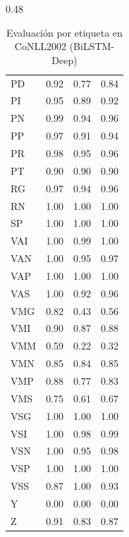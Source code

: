 \begin{table}[H]
\begin{subtable}{0.48\textwidth}
\begin{tabular}{lccc}
PD  & 0.92 & 0.77 & 0.84 \\
PI  & 0.95 & 0.89 & 0.92 \\
PN  & 0.99 & 0.94 & 0.96 \\
PP  & 0.97 & 0.91 & 0.94 \\
PR  & 0.98 & 0.95 & 0.96 \\
PT  & 0.90 & 0.90 & 0.90 \\
RG  & 0.97 & 0.94 & 0.96 \\
RN  & 1.00 & 1.00 & 1.00 \\
SP  & 1.00 & 1.00 & 1.00 \\
VAI & 1.00 & 0.99 & 1.00 \\
VAN & 1.00 & 0.95 & 0.97 \\
VAP & 1.00 & 1.00 & 1.00 \\
VAS & 1.00 & 0.92 & 0.96 \\
VMG & 0.82 & 0.43 & 0.56 \\
VMI & 0.90 & 0.87 & 0.88 \\
VMM & 0.59 & 0.22 & 0.32 \\
VMN & 0.85 & 0.84 & 0.85 \\
VMP & 0.88 & 0.77 & 0.83 \\
VMS & 0.75 & 0.61 & 0.67 \\
VSG & 1.00 & 1.00 & 1.00 \\
VSI & 1.00 & 0.98 & 0.99 \\
VSN & 1.00 & 0.95 & 0.98 \\
VSP & 1.00 & 1.00 & 1.00 \\
VSS & 0.87 & 1.00 & 0.93 \\
Y   & 0.00 & 0.00 & 0.00 \\
Z   & 0.91 & 0.83 & 0.87 \\
\hline
\end{tabular}
\caption{Part 2}
\end{subtable}

\caption{Evaluación por etiqueta en CoNLL2002 (BiLSTM-Deep)}
\end{table}
